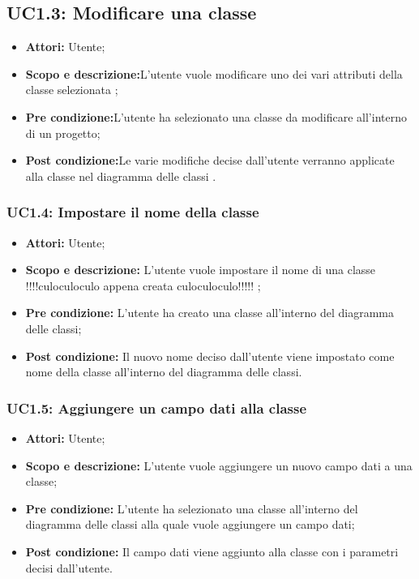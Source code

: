 \documentclass[a4paper]{report}
\begin{document}
\subsection{UC1.3: Modificare una classe}
\begin{itemize}
	\item \textbf{Attori:} Utente;
	\item \textbf{Scopo e descrizione:}L'utente vuole modificare uno dei vari attributi della classe selezionata ;
	\item \textbf{Pre condizione:}L'utente ha selezionato una classe da modificare all'interno di un progetto;
	\item \textbf{Post condizione:}Le varie modifiche decise dall'utente verranno applicate alla classe nel diagramma delle classi .
\end{itemize}

\subsubsection{UC1.4: Impostare il nome della classe}
\begin{itemize}
	\item \textbf{Attori:} Utente;
	\item \textbf{Scopo e descrizione: }L'utente vuole impostare il nome di una classe  !!!!culoculoculo  appena creata culoculoculo!!!!!  ;
	\item \textbf{Pre condizione: }L'utente ha creato una classe all'interno del diagramma delle classi;
	\item \textbf{Post condizione: }Il nuovo nome deciso dall'utente viene impostato come nome della classe all'interno del diagramma delle classi.
\end{itemize}

\subsubsection{UC1.5: Aggiungere un campo dati alla classe}
\begin{itemize}
	\item \textbf{Attori:} Utente;
	\item \textbf{Scopo e descrizione: }L'utente vuole aggiungere un nuovo campo dati a una classe;
	\item \textbf{Pre condizione: }L'utente ha selezionato una classe all'interno del diagramma delle classi alla quale vuole aggiungere un campo dati;
	\item \textbf{Post condizione: }Il campo dati viene aggiunto alla classe con i parametri decisi dall'utente.
\end{itemize}
\end{document}

